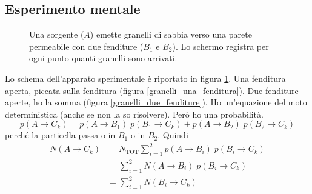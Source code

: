 \subsection{Esperimento mentale}
\begin{figure}
  \centering
  \caption{
    Una sorgente (\(A\)) emette granelli di sabbia verso una parete permeabile
    con due fenditure (\(B_1\) e \(B_2\)). Lo schermo registra per ogni punto
    quanti granelli sono arrivati.}
  \label{doppia_fenditura}
\end{figure}
Lo schema dell'apparato sperimentale è riportato in figura
\ref{doppia_fenditura}. Una fenditura aperta, piccata sulla fenditura (figura
\ref{granelli_una_fenditura}). Due fenditure aperte, ho la somma (figura
\ref{granelli_due_fenditure}). Ho un'equazione del moto deterministica (anche
se non la so risolvere). Però ho una probabilità.
\[
  p(A \rightarrow C_k) = p(A \rightarrow B_1)
  \; p(B_1 \rightarrow C_k) + p(A \rightarrow B_2)
  \; p(B_2 \rightarrow C_k)
\]
perché la particella passa o in \(B_1\) o in \(B_2\). Quindi
\begin{align*}
  N(A \rightarrow C_k)
  &= N_{\text{TOT}} \sum_{i = 1}^2
    p(A \rightarrow B_i) \; p(B_i \rightarrow C_k) \\
  &= \sum_{i = 1}^2 N(A \rightarrow B_i) \; p(B_i \rightarrow C_k) \\
  &= \sum_{i = 1}^2 N(B_i \rightarrow C_k)
\end{align*}

